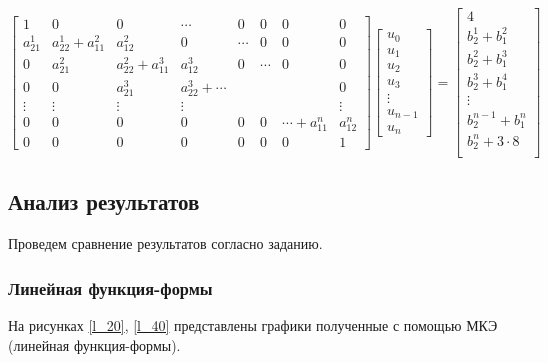 $$
\begin{bmatrix}
1     &   0        &   0 & \cdots & 0 & 0 & 0  & 0\\
a_{21}^1     &    a_{22}^1+a_{11}^2 & a_{12}^2  & 0 & \cdots & 0 & 0  & 0\\
0     &    a_{21}^2 & a_{22}^2+a_{11}^3  &  a_{12}^3  & 0 & \cdots & 0  & 0\\
0     &    0  & a_{21}^3  & a_{22}^3+ \cdots  &  & &   & 0\\
\vdots & \vdots & \vdots & \vdots &  &  &   & \vdots\\
0 & 0 & 0 & 0 &  0 & 0 & \cdots+a_{11}^n  & a_{12}^n\\
0 & 0 & 0 & 0 &  0 & 0 & 0 & 1
\end{bmatrix}
\begin{bmatrix}
u_0 \\
u_1 \\
u_2\\
u_3\\
\vdots\\
u_{n-1}\\
u_n
\end{bmatrix} =
\begin{bmatrix}
 4   \\
b_2^1+b_1^2\\
b_2^2+b_1^3\\
b_2^3+b_1^4\\
\vdots\\
b_2^{n-1}+b_1^n\\
 b_2^n   +3  \cdot 8   \\
\end{bmatrix}
$$

\subsection{Анализ результатов}

Проведем сравнение результатов согласно заданию.

\subsubsection{Линейная функция-формы}


На рисунках \ref{l_20}, \ref{l_40} представлены графики полученные с помощью МКЭ (линейная функция-формы).

